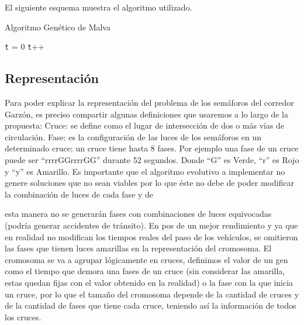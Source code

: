 El siguiente esquema muestra el algoritmo utilizado. \citep{MalvaAlgGenetico}

 
\begin{algorithm}[H]
	\caption{Algoritmo Genético de Malva}
	\label{alg:algoritmo_genetico_malva}
	\begin{algorithmic} [1] 
		{
			\STATE \texttt{t} = 0
			\STATE \texttt{t}++		
			\ENDWHILE
		}
	\end{algorithmic}

\end{algorithm}


 

\subsection{Representación}
Para poder explicar la representación del problema de los
semáforos del corredor Garzón, es preciso compartir algunas
definiciones que usaremos a lo largo de la propuesta:
Cruce: se define como el lugar de intersección de dos o
más vías de circulación.
Fase: es la configuración de las luces de los semáforos
en un determinado cruce; un cruce tiene hasta 8 fases.
Por ejemplo una fase de un cruce puede ser
“rrrrGGrrrrGG” durante 52 segundos. Donde “G” es
Verde, “r” es Rojo y “y” es Amarillo.  
Es  importante  que  el  algoritmo  evolutivo  a  implementar  no
genere soluciones que no sean viables por lo que éste no debe
de poder modificar la combinación de luces de cada fase y de

esta manera no se generarán fases con combinaciones de luces
equivocadas (podría generar accidentes de tránsito).
En  pos  de  un  mejor  rendimiento  y  ya  que  en  realidad  no
modifican  los  tiempos  reales  del  paso  de  los  vehículos,  se
omitieron  las   fases  que  tienen  luces  amarillas  en  la
representación del cromosoma.
El  cromosoma  se  va  a  agrupar  lógicamente  en  cruces,
definimos el valor de un gen como el tiempo que demora una
fases  de  un  cruce  (sin  considerar  las  amarilla,  estas  quedan
fijas con el valor obtenido en la realidad) o la fase con la que
inicia un cruce, por lo que el tamaño del cromosoma depende
de  la  cantidad  de  cruces  y  de  la  cantidad  de  fases  que  tiene
cada cruce, teniendo así la información de todos los cruces.

